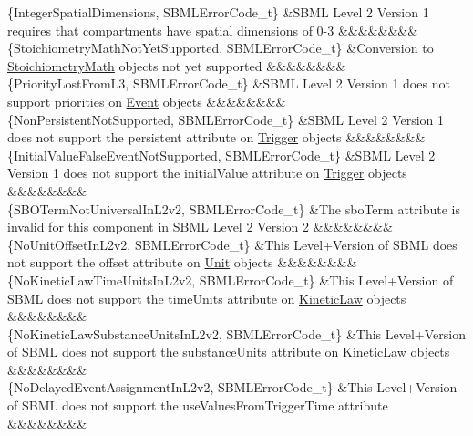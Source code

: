 \begin{DoxyParagraph}{}
\begin{longtabu}
\{Integer\+Spatial\+Dimensions, S\+B\+M\+L\+Error\+Code\+\_\+t\} &S\+B\+ML Level 2 Version 1 requires that compartments have spatial dimensions of 0-\/3 &&&&&&&&\\
\{Stoichiometry\+Math\+Not\+Yet\+Supported, S\+B\+M\+L\+Error\+Code\+\_\+t\} &Conversion to \hyperlink{class_stoichiometry_math}{Stoichiometry\+Math} objects not yet supported &&&&&&&&\\
\{Priority\+Lost\+From\+L3, S\+B\+M\+L\+Error\+Code\+\_\+t\} &S\+B\+ML Level 2 Version 1 does not support priorities on \hyperlink{class_event}{Event} objects &&&&&&&&\\
\{Non\+Persistent\+Not\+Supported, S\+B\+M\+L\+Error\+Code\+\_\+t\} &S\+B\+ML Level 2 Version 1 does not support the \textquotesingle{}persistent\textquotesingle{} attribute on \hyperlink{class_trigger}{Trigger} objects &&&&&&&&\\
\{Initial\+Value\+False\+Event\+Not\+Supported, S\+B\+M\+L\+Error\+Code\+\_\+t\} &S\+B\+ML Level 2 Version 1 does not support the \textquotesingle{}initial\+Value\textquotesingle{} attribute on \hyperlink{class_trigger}{Trigger} objects &&&&&&&&\\
\{S\+B\+O\+Term\+Not\+Universal\+In\+L2v2, S\+B\+M\+L\+Error\+Code\+\_\+t\} &The \textquotesingle{}sbo\+Term\textquotesingle{} attribute is invalid for this component in S\+B\+ML Level 2 Version 2 &&&&&&&&\\
\{No\+Unit\+Offset\+In\+L2v2, S\+B\+M\+L\+Error\+Code\+\_\+t\} &This Level+\+Version of S\+B\+ML does not support the \textquotesingle{}offset\textquotesingle{} attribute on \hyperlink{class_unit}{Unit} objects &&&&&&&&\\
\{No\+Kinetic\+Law\+Time\+Units\+In\+L2v2, S\+B\+M\+L\+Error\+Code\+\_\+t\} &This Level+\+Version of S\+B\+ML does not support the \textquotesingle{}time\+Units\textquotesingle{} attribute on \hyperlink{class_kinetic_law}{Kinetic\+Law} objects &&&&&&&&\\
\{No\+Kinetic\+Law\+Substance\+Units\+In\+L2v2, S\+B\+M\+L\+Error\+Code\+\_\+t\} &This Level+\+Version of S\+B\+ML does not support the \textquotesingle{}substance\+Units\textquotesingle{} attribute on \hyperlink{class_kinetic_law}{Kinetic\+Law} objects &&&&&&&&\\
\{No\+Delayed\+Event\+Assignment\+In\+L2v2, S\+B\+M\+L\+Error\+Code\+\_\+t\} &This Level+\+Version of S\+B\+ML does not support the \textquotesingle{}use\+Values\+From\+Trigger\+Time\textquotesingle{} attribute &&&&&&&&\\

\end{longtabu}
\end{DoxyParagraph}
